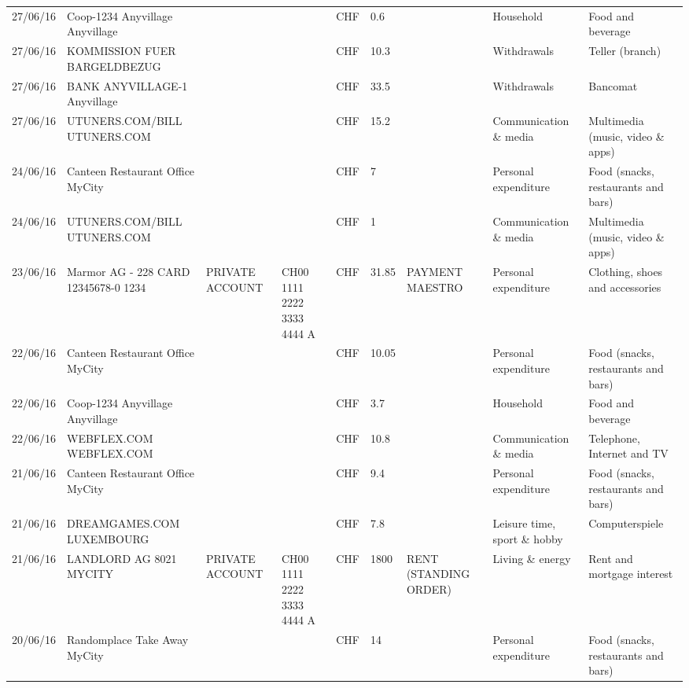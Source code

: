 \begin{landscape}
\begin{center}
\begin{longtable}{lllllllll}
		27/06/16 & Coop-1234 Anyvillage    Anyvillage &       &       & CHF   & 0.6   &       & Household & Food and beverage \\
		27/06/16 & KOMMISSION FUER BARGELDBEZUG &       &       & CHF   & 10.3  &       & Withdrawals & Teller (branch) \\
		27/06/16 & BANK ANYVILLAGE-1        Anyvillage &       &       & CHF   & 33.5  &       & Withdrawals & Bancomat \\
		27/06/16 & UTUNERS.COM/BILL          UTUNERS.COM &       &       & CHF   & 15.2  &       & Communication \& media & Multimedia (music, video \& apps) \\
		24/06/16 & Canteen Restaurant Office      MyCity &       &       & CHF   & 7     &       & Personal expenditure & Food (snacks, restaurants and bars) \\
		24/06/16 & UTUNERS.COM/BILL          UTUNERS.COM &       &       & CHF   & 1     &       & Communication \& media & Multimedia (music, video \& apps) \\
		23/06/16 & Marmor AG - 228 CARD 12345678-0 1234 & PRIVATE ACCOUNT & CH00 1111 2222 3333 4444 A & CHF   & 31.85 & PAYMENT MAESTRO & Personal expenditure & Clothing, shoes and accessories \\
		22/06/16 & Canteen Restaurant Office      MyCity &       &       & CHF   & 10.05 &       & Personal expenditure & Food (snacks, restaurants and bars) \\
		22/06/16 & Coop-1234 Anyvillage    Anyvillage &       &       & CHF   & 3.7   &       & Household & Food and beverage \\
		22/06/16 & WEBFLEX.COM              WEBFLEX.COM &       &       & CHF   & 10.8  &       & Communication \& media & Telephone,  Internet and TV \\
		21/06/16 & Canteen Restaurant Office      MyCity &       &       & CHF   & 9.4   &       & Personal expenditure & Food (snacks, restaurants and bars) \\
		21/06/16 & DREAMGAMES.COM           LUXEMBOURG &       &       & CHF   & 7.8   &       & Leisure time, sport \& hobby & Computerspiele \\
		21/06/16 & LANDLORD AG 8021 MYCITY & PRIVATE ACCOUNT & CH00 1111 2222 3333 4444 A & CHF   & 1800  & RENT (STANDING ORDER) & Living \& energy & Rent and mortgage interest \\
		20/06/16 & Randomplace Take Away     MyCity &       &       & CHF   & 14    &       & Personal expenditure & Food (snacks, restaurants and bars) \\

\end{longtable}
\end{center}
\end{landscape}
